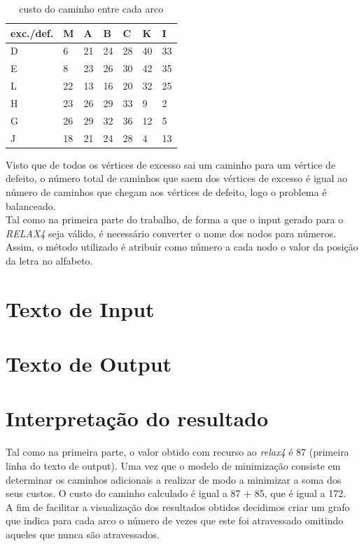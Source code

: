 \documentclass[a4paper]{report}
\begin{document}
\begin{table}[H]
\begin{tabular}{|l|l|l|l|l|l|l|}
\hline
exc./def. & M  & A  & B  & C  & K  & I  \\ \hline
D          & 6  & 21 & 24 & 28 & 40 & 33 \\ \hline
E          & 8  & 23 & 26 & 30 & 42 & 35 \\ \hline
L          & 22 & 13 & 16 & 20 & 32 & 25 \\ \hline
H          & 23 & 26 & 29 & 33 & 9  & 2  \\ \hline
G          & 26 & 29 & 32 & 36 & 12 & 5  \\ \hline
J          & 18 & 21 & 24 & 28 & 4  & 13 \\ \hline 
\end{tabular}
\caption{custo do caminho entre cada arco}
\end{table}
Visto que de todos os vértices de excesso sai um caminho para um vértice de
defeito, o número total de caminhos que saem dos vértices de excesso é igual ao
número de caminhos que chegam aos vértices de defeito, logo o problema é
balanceado.\\
Tal como na primeira parte do trabalho, de forma a que o input gerado para o
\textit{RELAX4} seja válido, é necessário converter o nome dos nodos para
números. Assim, o método utilizado é atribuir como número a cada nodo o valor da
posição da letra no alfabeto.

\pagebreak
\section{Texto de Input}
\label{input2}


\pagebreak
\section{Texto de Output}
\label{output2}


\pagebreak
\section{Interpretação do resultado}
\label{solution}
Tal como na primeira parte, o valor obtido com recurso ao \textit{relax4} é 87
(primeira linha do texto de output). Uma vez que o modelo de minimização
consiste em determinar os caminhos adicionais a realizar de modo a minimizar a
soma dos seus custos. O custo do caminho calculado é igual a 87 + 85, que é
igual a 172.\\
A fim de facilitar a visualização dos resultados obtidos decidimos criar um
grafo que indica para cada arco o número de vezes que este foi atravessado
omitindo aqueles que nunca são atravessados.
\end{document}
